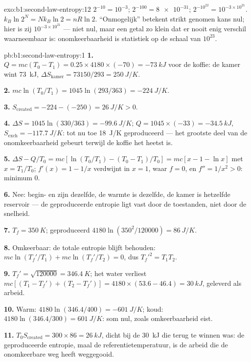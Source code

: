 \begin{solution}{exo:b1:second-law-entropy:12}
$2^{-10} = 10^{-3}$; $2^{-100} = \num{8e-31}$; $2^{-10^{22}} = 10^{-3\times10^{21}}$.
$k_B\ln2^N = Nk_B\ln2 = nR\ln2$. ``Onmogelijk'' betekent strikt genomen kans
nul; hier is zij $10^{-3\times10^{21}}$ --- niet nul, maar een getal zo klein dat
er nooit enig verschil waarneembaar is: onomkeerbaarheid is statistiek op
de schaal van $10^{23}$.
\end{solution}

\begin{solution}{pb:b1:second-law-entropy:1}
\textbf{1.} $Q = mc(T_0 - T_1) = 0.25 \times 4180 \times (-70) = \qty{-73}{kJ}$
voor de koffie: de kamer wint \qty{73}{kJ}, $\Delta S_{\text{kamer}} = 73150/293
= \qty{+250}{J/K}$.

\textbf{2.} $mc\ln(T_0/T_1) = 1045\ln(293/363) = \qty{-224}{J/K}$.

\textbf{3.} $S_{\mathrm{created}} = -224 - (-250) = \qty{+26}{J/K} > 0$.

\textbf{4.} $\Delta S = 1045\ln(330/363) = \qty{-99.6}{J/K}$; $Q = 1045 \times
(-33) = \qty{-34.5}{kJ}$, $S_{\mathrm{exch}} = \qty{-117.7}{J/K}$: tot nu toe
\qty{18}{J/K} geproduceerd --- het grootste deel van de onomkeerbaarheid gebeurt terwijl de
koffie het heetst is.

\textbf{5.} $\Delta S - Q/T_0 = mc[\ln(T_0/T_1) - (T_0 - T_1)/T_0] = mc[x - 1 -
\ln x]$ met $x = T_1/T_0$; $f'(x) = 1 - 1/x$ verdwijnt in $x = 1$, waar
$f = 0$, en $f'' = 1/x^2 > 0$: minimum $0$.

\textbf{6.} Nee: begin- en  zijn dezelfde, de warmte is
dezelfde, de kamer is hetzelfde reservoir --- de geproduceerde entropie ligt vast door
de toestanden, niet door de snelheid.

\textbf{7.} $T_f = \qty{350}{K}$; geproduceerd $4180\ln(350^2/120000) = \qty{86}{J/K}$.

\textbf{8.} Omkeerbaar: de totale entropie blijft behouden: $mc\ln(T_f'/T_1) + mc\ln(T_f'/
T_2) = 0$, dus $T_f'^2 = T_1T_2$.

\textbf{9.} $T_f' = \sqrt{120000} = \qty{346.4}{K}$; het water verliest $mc[(T_1 -
T_f') + (T_2 - T_f')] = 4180 \times (53.6 - 46.4) = \qty{30}{kJ}$, geleverd als
arbeid.

\textbf{10.} Warm: $4180\ln(346.4/400) = \qty{-601}{J/K}$; koud: $4180\ln(346.4/
300) = \qty{+601}{J/K}$: som nul, zoals omkeerbaarheid eist.

\textbf{11.} $T_0S_{\mathrm{created}} = 300 \times 86 = \qty{26}{kJ}$, dicht bij de
\qty{30}{kJ} die terug te winnen was: de geproduceerde entropie, maal de
referentietemperatuur, is de arbeid die de onomkeerbare weg heeft weggegooid.


\end{solution}
